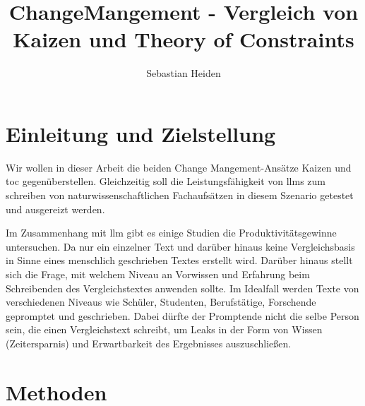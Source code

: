 \documentclass[acmlarge,authorversion,nonacm]{acmart}
\begin{document}
	\title{ChangeMangement - Vergleich von Kaizen und Theory of Constraints}
	
	\author{Sebastian Heiden}

\begin{abstract}

\end{abstract}




\maketitle

\section{Einleitung und Zielstellung}

Wir wollen in dieser Arbeit die beiden Change Mangement-Ansätze Kaizen und \gls{toc} gegenüberstellen.
Gleichzeitig soll die Leistungsfähigkeit von \glspl{llm} zum schreiben von naturwissenschaftlichen Fachaufsätzen in diesem Szenario getestet und ausgereizt werden.

Im Zusammenhang mit \gls{llm} gibt es einige Studien  die Produktivitätsgewinne untersuchen. Da nur ein einzelner Text und darüber hinaus keine Vergleichsbasis in Sinne eines menschlich geschrieben Textes erstellt wird. Darüber hinaus stellt sich die Frage, mit welchem Niveau an Vorwissen und Erfahrung beim Schreibenden des Vergleichstextes anwenden sollte. Im Idealfall werden Texte von verschiedenen Niveaus wie Schüler, Studenten, Berufstätige, Forschende gepromptet und geschrieben. Dabei dürfte der Promptende nicht die selbe Person sein, die einen Vergleichstext schreibt, um Leaks in der Form von Wissen (Zeitersparnis) und Erwartbarkeit des Ergebnisses auszuschließen.
\section{Methoden}\label{sec:methods}

\end{document}
